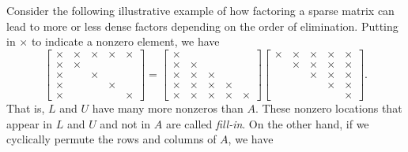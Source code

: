 \documentclass[12pt, leqno]{article}
\begin{document}
Consider the following illustrative example of how factoring a sparse
matrix can lead to more or less dense factors depending on the order
of elimination.  Putting in $\times$ to indicate a nonzero element, we
have
\[
  \begin{bmatrix}
    \times & \times & \times & \times & \times \\
    \times & \times &        &        &        \\
    \times &        & \times &        &        \\
    \times &        &        & \times &        \\
    \times &        &        &        & \times
  \end{bmatrix} =
  \begin{bmatrix}
    \times &        &        &        &        \\
    \times & \times &        &        &        \\
    \times & \times & \times &        &        \\
    \times & \times & \times & \times &        \\
    \times & \times & \times & \times & \times
  \end{bmatrix}
  \begin{bmatrix}
    \times & \times & \times & \times & \times \\
           & \times & \times & \times & \times \\
           &        & \times & \times & \times \\
           &        &        & \times & \times \\
           &        &        &        & \times
  \end{bmatrix}.
\]
That is, $L$ and $U$ have many more nonzeros than $A$.
These nonzero locations that appear in $L$ and $U$ and not in $A$
are called {\em fill-in}.  On the other hand, if we cyclically
permute the rows and columns of $A$, we have
\end{document}
